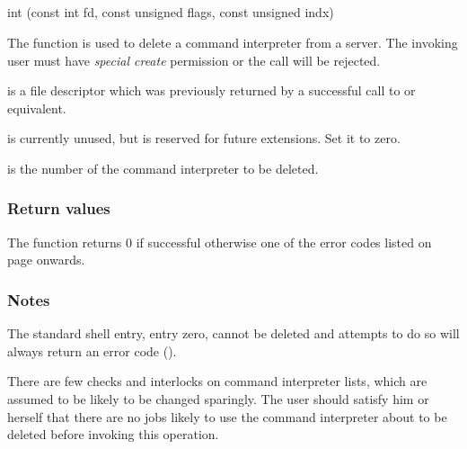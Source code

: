 \subsection{\funcnameXBcidel{}}

\begin{expara}

int \funcnameXBcidel{}(const int fd, const unsigned flags, const unsigned indx)

\end{expara}

The function \funcXBcidel{} is used to delete a
command interpreter from a \ProductName{} server.
The invoking user must have \textit{special create} permission or the
call will be rejected.

 is a file descriptor which was previously
returned by a successful call to \funcXBopen{} or equivalent.

 is currently unused, but is reserved for
future extensions. Set it to zero.

 is the number of the command interpreter to
be deleted.

\subsubsection{Return values}
The function returns 0 if successful otherwise one of the error codes
listed on page \pageref{errorcodes} onwards.

\subsubsection{Notes}
The standard shell entry, entry zero, cannot be deleted and attempts to
do so will always return an error code
().

There are few checks and interlocks on command interpreter lists, which
are assumed to be likely to be changed sparingly. The user should
satisfy him or herself that there are no jobs likely to use the command
interpreter about to be deleted before invoking this operation.

